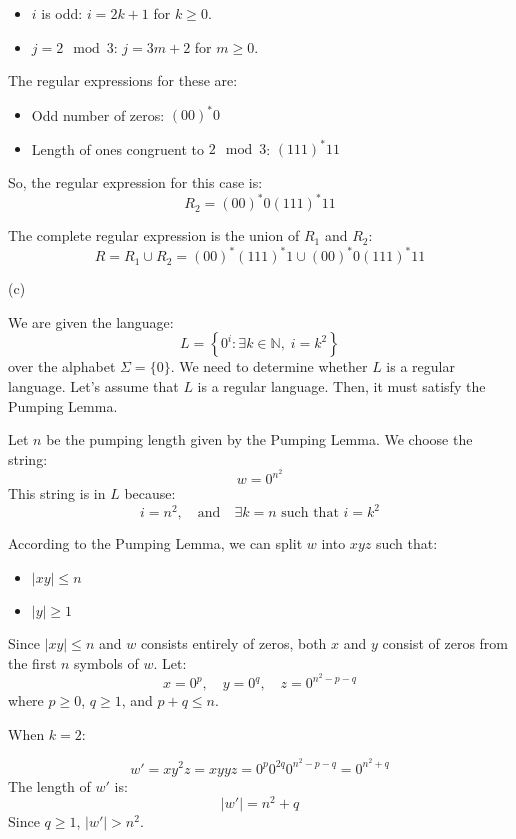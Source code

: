 \documentclass[12 pt]{article}
\begin{document}
\begin{itemize}
    \item \(i\) is odd: \(i = 2k + 1\) for \(k \geq 0\).
    \item \(j = 2 \mod 3\): \(j = 3m + 2\) for \(m \geq 0\).
\end{itemize}

The regular expressions for these are:

\begin{itemize}
    \item Odd number of zeros: \((00)^*0\)
    \item Length of ones congruent to \(2 \mod 3\): \((111)^*11\)
\end{itemize}

So, the regular expression for this case is:
\[
R_2 = (00)^*0(111)^*11
\]

The complete regular expression is the union of \(R_1\) and \(R_2\):
\[
R = R_1 \cup R_2 = (00)^*(111)^*1 \cup (00)^*0(111)^*11
\]

\vspace{1cm}

(c)

We are given the language:
\[
L = \left\{ 0^i : \exists k \in \mathbb{N}, \; i = k^2 \right\}
\]
over the alphabet \(\Sigma = \{0\}\). We need to determine whether \(L\) is a regular language. Let's assume that \(L\) is a regular language. Then, it must satisfy the Pumping Lemma.


Let \(n\) be the pumping length given by the Pumping Lemma. We choose the string:
\[
w = 0^{n^2}
\]
This string is in \(L\) because:
\[
i = n^2, \quad \text{and} \quad \exists k = n \text{ such that } i = k^2
\]


According to the Pumping Lemma, we can split \(w\) into \(xyz\) such that:
\begin{itemize}
    \item \( |xy| \leq n \)
    \item \( |y| \geq 1 \)
\end{itemize}

Since \(|xy| \leq n\) and \(w\) consists entirely of zeros, both \(x\) and \(y\) consist of zeros from the first \(n\) symbols of \(w\). Let:
\[
x = 0^{p}, \quad y = 0^{q}, \quad z = 0^{n^2 - p - q}
\]
where \(p \geq 0\), \(q \geq 1\), and \(p + q \leq n\).


When \( k = 2 \):

\[
w' = xy^2z = xyyz = 0^{p}0^{2q}0^{n^2 - p - q} = 0^{n^2 + q}
\]
The length of \(w'\) is:
\[
|w'| = n^2 + q
\]
Since \(q \geq 1\), \( |w'| > n^2 \).
\end{document}
